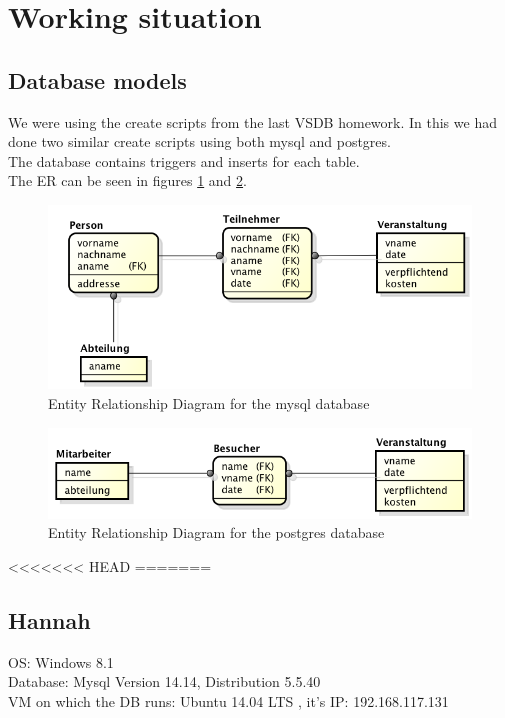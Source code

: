 \documentclass[10pt]{article}
\begin{document}
\section{Working situation}
\subsection{Database models}
We were using the create scripts from the last VSDB homework. In this we had done two similar create scripts using both mysql and postgres. \\ The database contains triggers and inserts for each table.\\ The ER can be seen in figures \ref{mysqler} and \ref{pger}.
\begin{figure}[!h]
	\begin{center}
		\includegraphics[width=0.8\linewidth]{pictures/ERD_mysql}
		\caption{Entity Relationship Diagram for the mysql database}
		\label{mysqler}
	\end{center}
\end{figure}
\begin{figure}[!h]
	\begin{center}
		\includegraphics[width=0.8\linewidth]{pictures/ERD_psql}
		\caption{Entity Relationship Diagram for the postgres database}
		\label{pger}
	\end{center}
\end{figure}
\FloatBarrier
<<<<<<< HEAD
=======
\subsection{Hannah}
OS: Windows 8.1 \\
Database: Mysql Version 14.14, Distribution 5.5.40 \\
VM on which the DB runs: Ubuntu 14.04 LTS , it's IP: 192.168.117.131
\end{document}
